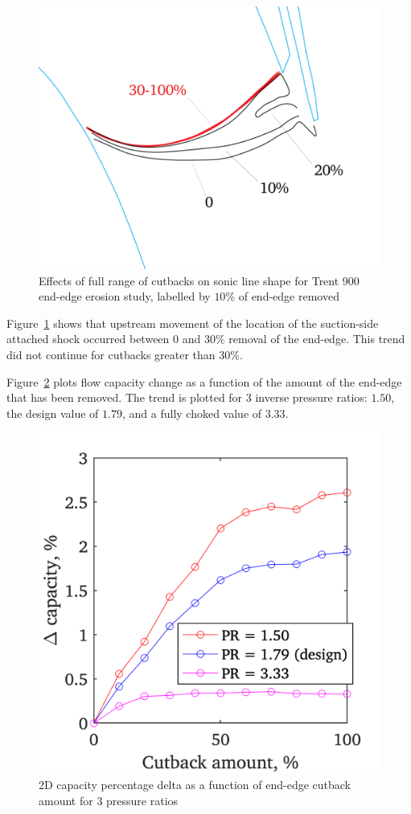 \documentclass[a4paper, 11pt, oneside]{report}
\begin{document}
\begin{figure}[H]
      \centering
      \includegraphics[width=.7\textwidth]{figs/ss_cutbacks_m1_lines_illustration.png}
      \caption{Effects of full range of cutbacks on sonic line shape for Trent 900 end-edge erosion study, labelled by $10\%$ of end-edge removed}
      \label{fig:ss_cutbacks_m1_lines_illustration}
\end{figure}

Figure~\ref{fig:ss_cutbacks_m1_lines_illustration} shows that upstream movement of the location of the suction-side attached shock occurred between $0$ and $30\%$ removal of the end-edge. This trend did not continue for cutbacks greater than $30\%$.

Figure~\ref{fig:ss_cutbacks_vs_capacities_pressure_ratios} plots flow capacity change as a function of the amount of the end-edge that has been removed. The trend is plotted for 3 inverse pressure ratios: $1.50$, the design value of $1.79$, and a fully choked value of $3.33$.

\begin{figure}[H]
	\centering
	\includegraphics[width=.45\textwidth]{figs/ss_cutbacks_vs_capacities_pressure_ratios.png}
	\caption{2D capacity percentage delta as a function of end-edge cutback amount for $3$ pressure ratios}
    \label{fig:ss_cutbacks_vs_capacities_pressure_ratios}
\end{figure}
\end{document}
